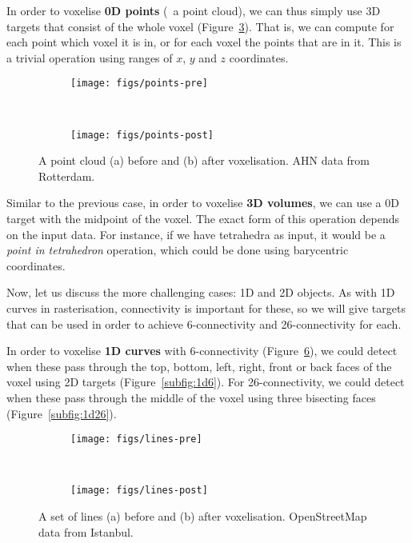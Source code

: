 In order to voxelise \textbf{0D points} (\eg\ a point cloud), we can thus simply use 3D targets that consist of the whole voxel (Figure~\ref{fig:points}).
That is, we can compute for each point which voxel it is in, or for each voxel the points that are in it.
This is a trivial operation using ranges of \(x\), \(y\) and \(z\) coordinates.

\begin{figure}
\centering
\begin{subfigure}[b]{\linewidth}
\texttt{[image: figs/points-pre]}
\caption{}%
\label{subfig:points-pre}
\end{subfigure}
\\
\begin{subfigure}[b]{\linewidth}
\texttt{[image: figs/points-post]}
\caption{}%
\label{subfig:points-post}
\end{subfigure}
\caption{A point cloud (a) before and (b) after voxelisation. AHN data from Rotterdam.}%
\label{fig:points}
\end{figure}

Similar to the previous case, in order to voxelise \textbf{3D volumes}, we can use a 0D target with the midpoint of the voxel.
The exact form of this operation depends on the input data.
For instance, if we have tetrahedra as input, it would be a \emph{point in tetrahedron} operation, which could be done using barycentric coordinates.

Now, let us discuss the more challenging cases: 1D and 2D objects.
As with 1D curves in rasterisation, connectivity is important for these, so we will give targets that can be used in order to achieve 6-connectivity and 26-connectivity for each.

In order to voxelise \textbf{1D curves} with 6-connectivity (Figure~\ref{fig:lines}), we could detect when these pass through the top, bottom, left, right, front or back faces of the voxel using 2D targets (Figure~\ref{subfig:1d6}).
For 26-connectivity, we could detect when these pass through the middle of the voxel using three bisecting faces (Figure~\ref{subfig:1d26}).

\begin{figure}
\centering
\begin{subfigure}[b]{\linewidth}
\texttt{[image: figs/lines-pre]}
\caption{}%
\label{subfig:lines-pre}
\end{subfigure}
\\
\begin{subfigure}[b]{\linewidth}
\texttt{[image: figs/lines-post]}
\caption{}%
\label{subfig:lines-post}
\end{subfigure}
\caption{A set of lines (a) before and (b) after voxelisation. OpenStreetMap data from Istanbul.}%
\label{fig:lines}
\end{figure}


